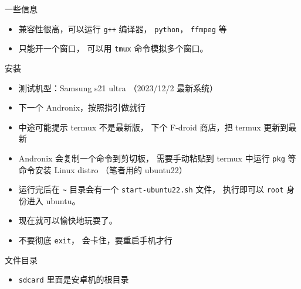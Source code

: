 
一些信息
\begin{itemize}
\item 兼容性很高，可以运行 \verb`g++` 编译器， \verb`python`， \verb`ffmpeg` 等
\item 只能开一个窗口， 可以用 \verb`tmux` 命令模拟多个窗口。
\end{itemize}


安装
\begin{itemize}
\item 测试机型：Samsung s21 ultra （2023/12/2 最新系统）
\item 下一个 Andronix，按照指引做就行
\item 中途可能提示 termux 不是最新版， 下个 F-droid 商店，把 termux 更新到最新
\item Andronix 会复制一个命令到剪切板， 需要手动粘贴到 termux 中运行 \verb`pkg` 等命令安装 Linux distro （笔者用的 ubuntu22）
\item 运行完后在 \verb`~` 目录会有一个 \verb`start-ubuntu22.sh` 文件， 执行即可以 \verb`root` 身份进入 ubuntu。
\item 现在就可以愉快地玩耍了。
\item 不要彻底 \verb`exit`， 会卡住，要重启手机才行
\end{itemize}


文件目录
\begin{itemize}
\item \verb`sdcard` 里面是安卓机的根目录
\end{itemize}

